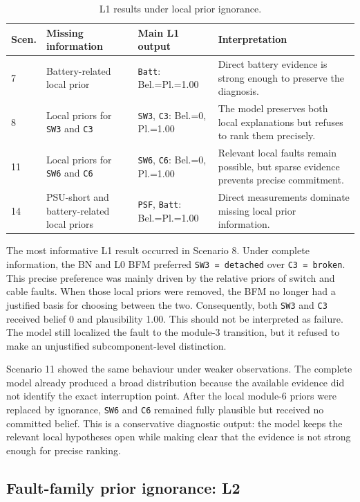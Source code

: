 \documentclass[runningheads]{llncs}
\begin{document}
\begin{table}[H]
\caption{L1 results under local prior ignorance.}\label{tab:l1_results}
\centering
\small
\begin{tabularx}{\textwidth}{p{0.9cm}p{3.0cm}p{3.9cm}X}
\toprule
Scen. & Missing information & Main L1 output & Interpretation \\
\midrule
7 & Battery-related local prior & \texttt{Batt}: Bel.=Pl.=1.00 & Direct battery evidence is strong enough to preserve the diagnosis. \\
8 & Local priors for \texttt{SW3} and \texttt{C3} & \texttt{SW3}, \texttt{C3}: Bel.=0, Pl.=1.00 & The model preserves both local explanations but refuses to rank them precisely. \\
11 & Local priors for \texttt{SW6} and \texttt{C6} & \texttt{SW6}, \texttt{C6}: Bel.=0, Pl.=1.00 & Relevant local faults remain possible, but sparse evidence prevents precise commitment. \\
14 & PSU-short and battery-related local priors & \texttt{PSF}, \texttt{Batt}: Bel.=Pl.=1.00 & Direct measurements dominate missing local prior information. \\
\bottomrule
\end{tabularx}
\end{table}

The most informative L1 result occurred in Scenario 8. Under complete information, the BN and L0 BFM preferred \texttt{SW3 = detached} over \texttt{C3 = broken}. This precise preference was mainly driven by the relative priors of switch and cable faults. When those local priors were removed, the BFM no longer had a justified basis for choosing between the two. Consequently, both \texttt{SW3} and \texttt{C3} received belief 0 and plausibility 1.00. This should not be interpreted as failure. The model still localized the fault to the module-3 transition, but it refused to make an unjustified subcomponent-level distinction.

Scenario 11 showed the same behaviour under weaker observations. The complete model already produced a broad distribution because the available evidence did not identify the exact interruption point. After the local module-6 priors were replaced by ignorance, \texttt{SW6} and \texttt{C6} remained fully plausible but received no committed belief. This is a conservative diagnostic output: the model keeps the relevant local hypotheses open while making clear that the evidence is not strong enough for precise ranking.

\subsection{Fault-family prior ignorance: L2}
\label{sec:l2_fault_family_prior_ignorance}
\end{document}
